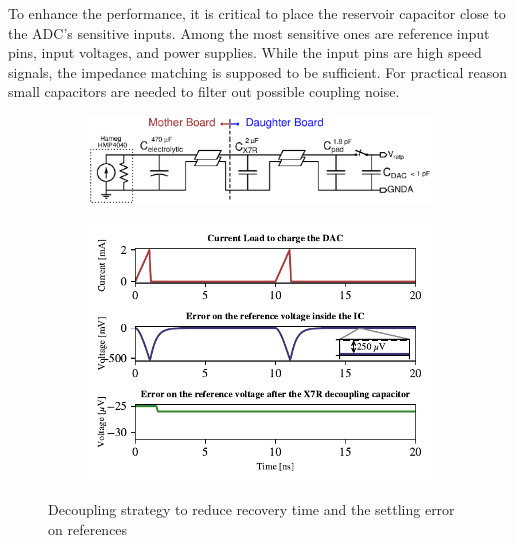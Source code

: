 To enhance the performance, it is critical to place the reservoir capacitor close to the ADC’s sensitive inputs. Among the most sensitive ones are reference input pins, input voltages, and power supplies. While the input pins are high speed signals, the impedance matching is supposed to be sufficient. For practical reason small capacitors are needed to filter out possible coupling noise. 

\begin{figure}[htp]
    \centering
    \begin{subfigure}[c]{0.8\textwidth}
        \includegraphics[width=\textwidth]{Chapter5/Figs/PCB/decoupling_cap_reference.ps}
    \end{subfigure}
    \begin{subfigure}[c]{0.8\textwidth}
        \includegraphics[width=\textwidth]{Chapter5/Figs/PCB/decap-reference-sar.pdf}
    \end{subfigure}
    \caption{Decoupling strategy to reduce recovery time and the settling error on references}
    \label{fig:decoupling-strategy}
\end{figure}

